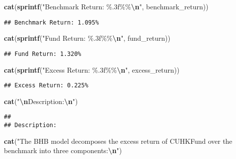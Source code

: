 \documentclass[
]{article}
\newenvironment{Shaded}{\begin{snugshade}}{\end{snugshade}}
\newcommand{\FunctionTok}[1]{\textcolor[rgb]{0.13,0.29,0.53}{\textbf{#1}}}
\newcommand{\NormalTok}[1]{#1}
\newcommand{\SpecialCharTok}[1]{\textcolor[rgb]{0.81,0.36,0.00}{\textbf{#1}}}
\newcommand{\StringTok}[1]{\textcolor[rgb]{0.31,0.60,0.02}{#1}}
\begin{document}
\begin{Shaded}
\begin{Highlighting}[]
\FunctionTok{cat}\NormalTok{(}\FunctionTok{sprintf}\NormalTok{(}\StringTok{"Benchmark Return: \%.3f\%\%}\SpecialCharTok{\textbackslash{}n}\StringTok{"}\NormalTok{, benchmark\_return))}
\end{Highlighting}
\end{Shaded}

\begin{verbatim}
## Benchmark Return: 1.095%
\end{verbatim}

\begin{Shaded}
\begin{Highlighting}[]
\FunctionTok{cat}\NormalTok{(}\FunctionTok{sprintf}\NormalTok{(}\StringTok{"Fund Return: \%.3f\%\%}\SpecialCharTok{\textbackslash{}n}\StringTok{"}\NormalTok{, fund\_return))}
\end{Highlighting}
\end{Shaded}

\begin{verbatim}
## Fund Return: 1.320%
\end{verbatim}

\begin{Shaded}
\begin{Highlighting}[]
\FunctionTok{cat}\NormalTok{(}\FunctionTok{sprintf}\NormalTok{(}\StringTok{"Excess Return: \%.3f\%\%}\SpecialCharTok{\textbackslash{}n}\StringTok{"}\NormalTok{, excess\_return))}
\end{Highlighting}
\end{Shaded}

\begin{verbatim}
## Excess Return: 0.225%
\end{verbatim}

\begin{Shaded}
\begin{Highlighting}[]
\FunctionTok{cat}\NormalTok{(}\StringTok{"}\SpecialCharTok{\textbackslash{}n}\StringTok{Description:}\SpecialCharTok{\textbackslash{}n}\StringTok{"}\NormalTok{)}
\end{Highlighting}
\end{Shaded}

\begin{verbatim}
## 
## Description:
\end{verbatim}

\begin{Shaded}
\begin{Highlighting}[]
\FunctionTok{cat}\NormalTok{(}\StringTok{"The BHB model decomposes the excess return of CUHKFund over the benchmark into three components:}\SpecialCharTok{\textbackslash{}n}\StringTok{"}\NormalTok{)}
\end{Highlighting}
\end{Shaded}
\end{document}
